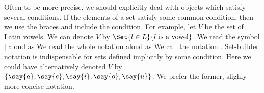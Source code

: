 Often to be more precise, we should
explicitly deal with objects which
satisfy several conditions.
If the elements of a set satisfy
some common condition, then we use
the braces and include the condition.
For example, let $V$ be the set of
Latin vowels.
We can denote $V$ by
$\Set{l \in L}{l \text{ is a vowel}}$.
We read the symbol $\mid$ aloud as
We read the whole notation aloud as
We call the notation
.
Set-builder notation is indispensable for
sets defined implicitly by some condition.
Here we could have alternatively denoted
$V$ by
$\set{\say{a},\say{e},\say{i},\say{o},\say{u}}$.
We prefer the former, slighly more concise notation.


\strats
